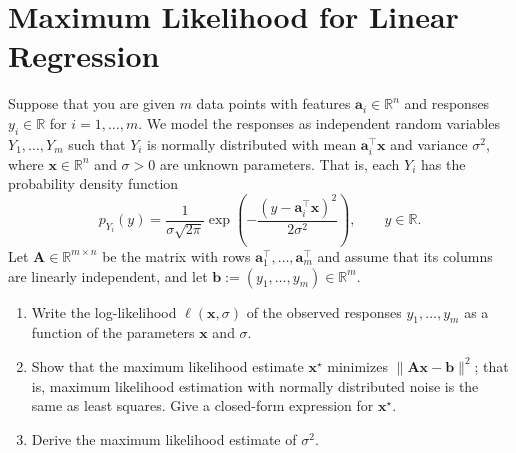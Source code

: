\documentclass[letterpaper]{article}
\newcommand{\Real}{\mathbb{R}}
\newcommand{\tr}{^\top}
\newcommand{\opt}{^\star}
\begin{document}
\section{Maximum Likelihood for Linear Regression} \label{sec:linreg-mle}
Suppose that you are given $m$ data points with features $\bm{a}_i \in \Real^n$ and responses $y_i \in \Real$ for $i = 1, \dots, m$. We model the responses as independent random variables $Y_1, \dots, Y_m$ such that $Y_i$ is normally distributed with mean $\bm{a}_i\tr \bm{x}$ and variance $\sigma^2$, where $\bm{x} \in \Real^n$ and $\sigma > 0$ are unknown parameters. That is, each $Y_i$ has the probability density function
\[
  p_{Y_i}(y) = \frac{1}{\sigma \sqrt{2\pi}} \exp\left( -\frac{(y - \bm{a}_i\tr \bm{x})^2}{2 \sigma^2} \right), \qquad y \in \Real.
\]
Let $\bm{A} \in \Real^{m\times n}$ be the matrix with rows $\bm{a}_1\tr, \dots, \bm{a}_m\tr$ and assume that its columns are linearly independent, and let $\bm{b} := (y_1, \dots, y_m) \in \Real^m$.
\begin{enumerate}
\item Write the log-likelihood $\ell(\bm{x}, \sigma)$ of the observed responses $y_1, \dots, y_m$ as a function of the parameters $\bm{x}$ and $\sigma$.
\item Show that the maximum likelihood estimate $\bm{x}\opt$ minimizes $\| \bm{A}\bm{x} - \bm{b} \|^2$; that is, maximum likelihood estimation with normally distributed noise is the same as least squares. Give a closed-form expression for $\bm{x}\opt$.
\item Derive the maximum likelihood estimate of $\sigma^2$.
\end{enumerate}
\end{document}
